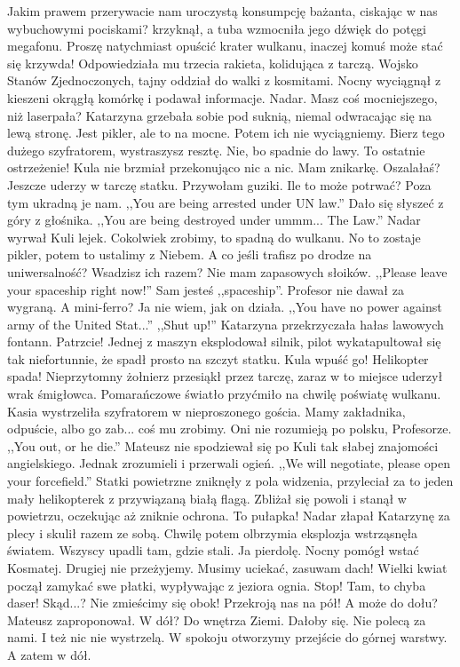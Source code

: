 \begin{dialogue}
\ds{} Jakim prawem przerywacie nam uroczystą konsumpcję bażanta, ciskając w nas wybuchowymi pociskami? \dm{}
krzyknął, a tuba wzmocniła jego dźwięk do potęgi megafonu. \dm{}
Proszę natychmiast opuścić krater wulkanu, inaczej komuś może stać się krzywda! \dm{} Odpowiedziała mu trzecia rakieta, kolidująca z tarczą.
\ds{} Wojsko Stanów Zjednoczonych, tajny oddział do walki z kosmitami. \dm{} Nocny wyciągnął z kieszeni okrągłą komórkę i podawał informacje.
\ds{} Nadar. Masz coś mocniejszego, niż laserpała? \dm{} Katarzyna grzebała sobie pod suknią, niemal odwracając się na lewą stronę.
\ds{} Jest pikler, ale to na mocne. Potem ich nie wyciągniemy.
\ds{} Bierz tego dużego szyfratorem, wystraszysz resztę.
\ds{} Nie, bo spadnie do lawy.
\ds{} To ostatnie ostrzeżenie! \dm{} Kula nie brzmiał przekonująco nic a nic.
\ds{} Mam znikarkę.
\ds{} Oszalałaś? Jeszcze uderzy w tarczę statku. Przywołam guziki.
\ds{} Ile to może potrwać? Poza tym ukradną je nam.
\ds{} ,,You are being arrested under UN law.'' \dm{} Dało się słyszeć z góry z głośnika.
\ds{} ,,You are being destroyed under ummm... The Law.'' \dm{} Nadar wyrwał Kuli lejek.
\ds{} Cokolwiek zrobimy, to spadną do wulkanu.
\ds{} No to zostaje pikler, potem to ustalimy z Niebem.
\ds{} A co jeśli trafisz po drodze na uniwersalność? Wsadzisz ich razem? Nie mam zapasowych słoików.
\ds{} ,,Please leave your spaceship right now!''
\ds{} Sam jesteś ,,spaceship''. \dm{} Profesor nie dawał za wygraną.
\ds{} A mini-ferro?
\ds{} Ja nie wiem, jak on działa.
\ds{} ,,You have no power against army of the United Stat...''
\ds{} ,,Shut up!'' \dm{} Katarzyna przekrzyczała hałas lawowych fontann. 
\ds{} Patrzcie! \dm{} Jednej z maszyn eksplodował silnik, pilot wykatapultował się tak niefortunnie, że spadł prosto na szczyt statku.
\ds{} Kula wpuść go! Helikopter spada! \dm{} Nieprzytomny żołnierz przesiąkł przez tarczę, zaraz w to miejsce uderzył wrak śmigłowca. 
Pomarańczowe światło przyćmiło na chwilę poświatę wulkanu. Kasia wystrzeliła szyfratorem w nieproszonego gościa.
\ds{} Mamy zakładnika, odpuście, albo go zab... coś mu zrobimy.
\ds{} Oni nie rozumieją po polsku, Profesorze.
\ds{} ,,You out, or he die.'' \dm{} Mateusz nie spodziewał się po Kuli tak słabej znajomości angielskiego. Jednak zrozumieli i przerwali ogień.
\ds{} ,,We will negotiate, please open your forcefield.'' \dm{} Statki powietrzne zniknęły z pola widzenia, przyleciał za to jeden mały helikopterek z przywiązaną białą flagą.
Zbliżał się powoli i stanął w powietrzu, oczekując aż zniknie ochrona.
\ds{} To pułapka! \dm{} Nadar złapał Katarzynę za plecy i skulił razem ze sobą. Chwilę potem olbrzymia eksplozja wstrząsnęła światem. Wszyscy upadli tam, gdzie stali.
\ds{} Ja pierdolę. \dm{} Nocny pomógł wstać Kosmatej. \dm{} Drugiej nie przeżyjemy.
\ds{} Musimy uciekać, zasuwam dach! \dm{} Wielki kwiat począł zamykać swe płatki, wypływając z jeziora ognia.
\ds{} Stop! Tam, to chyba daser!
\ds{} Skąd...?
\ds{} Nie zmieścimy się obok! Przekroją nas na pół!
\ds{} A może do dołu? \dm{} Mateusz zaproponował.
\ds{} W dół?
\ds{} Do wnętrza Ziemi.
\ds{} Dałoby się.
\ds{} Nie polecą za nami.
\ds{} I też nic nie wystrzelą.
\ds{} W spokoju otworzymy przejście do górnej warstwy.
\ds{} A zatem w dół.
\end{dialogue}

